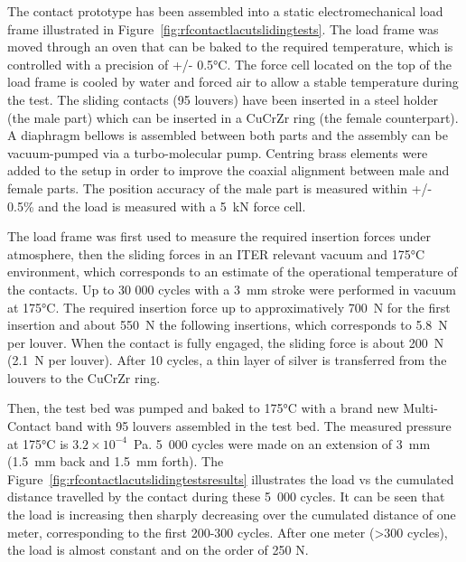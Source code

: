 {The contact prototype has been assembled into a static electromechanical load frame illustrated in Figure~\ref{fig:rfcontactlacutslidingtests}. The load frame was moved through an oven that can be baked to the required temperature, which is controlled with a precision of +/- 0.5$\si{\degreeCelsius}$. The force cell located on the top of the load frame is cooled by water and forced air to allow a stable temperature during the test. The sliding contacts (95 louvers) have been inserted in a steel holder (the male part) which can be inserted in a CuCrZr ring (the female counterpart). A diaphragm bellows is assembled between both parts and the assembly can be vacuum-pumped via a turbo-molecular pump. Centring brass elements were added to the setup in order to improve the coaxial alignment between male and female parts. The position accuracy of the male part is measured within +/- 0.5\% and the load is measured with a 5~kN force cell. 


The load frame was first used to measure the required insertion forces under atmosphere, then the sliding forces in an ITER relevant vacuum and 175$\si{\degreeCelsius}$ environment, which corresponds to an estimate of the operational temperature of the contacts. Up to 30 000 cycles with a 3~mm stroke were performed in vacuum at 175$\si{\degreeCelsius}$. The required insertion force up to approximatively 700~N for the first insertion and about 550~N the following insertions, which corresponds to 5.8~N per louver. When the contact is fully engaged, the sliding force is about 200~N (2.1~N per louver). After 10 cycles, a thin layer of silver is transferred from the louvers to the CuCrZr ring. 

Then, the test bed was pumped and baked to 175$\si{\degreeCelsius}$ with a brand new Multi-Contact band with 95 louvers assembled in the test bed. The measured pressure at 175$\si{\degreeCelsius}$ is $3.2\times 10^{-4}$~Pa. 5~000 cycles were made on an extension of 3~mm (1.5~mm back and 1.5~mm forth). The Figure~\ref{fig:rfcontactlacutslidingtestsresults} illustrates the load vs the cumulated distance travelled by the contact during these 5~000 cycles. It can be seen that the load is increasing then sharply decreasing over the cumulated distance of one meter, corresponding to the first 200-300 cycles. After one meter (>300 cycles), the load is almost constant and on the order of 250 N.


}
